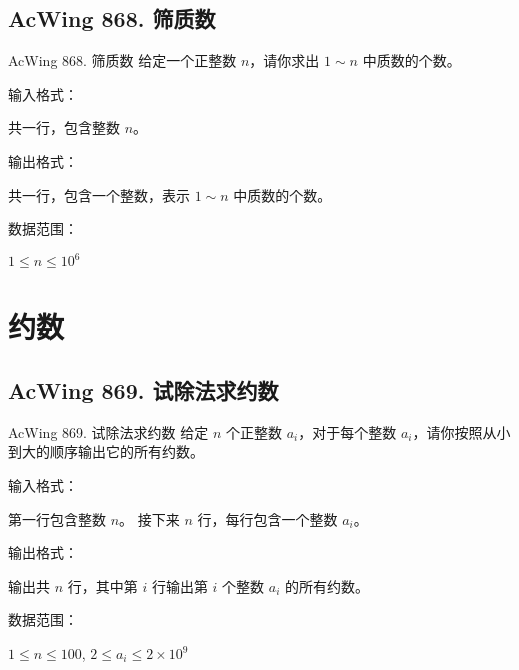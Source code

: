 \subsection{AcWing 868. 筛质数}
\begin{titledbox}{AcWing 868. 筛质数}
    给定一个正整数 $n$，请你求出 $1 \sim n$ 中质数的个数。

    输入格式：

    共一行，包含整数 $n$。

    输出格式：

    共一行，包含一个整数，表示 $1 \sim n$ 中质数的个数。

    数据范围：

    $1 \le n \le 10^6$

    \begin{inputblock}
    \end{inputblock}
    \begin{outputblock}
    \end{outputblock}
\end{titledbox}


\section{约数}

\subsection{AcWing 869. 试除法求约数}
\begin{titledbox}{AcWing 869. 试除法求约数}
    给定 $n$ 个正整数 $a_i$，对于每个整数 $a_i$，请你按照从小到大的顺序输出它的所有约数。

    输入格式：

    第一行包含整数 $n$。 接下来 $n$ 行，每行包含一个整数 $a_i$。

    输出格式：

    输出共 $n$ 行，其中第 $i$ 行输出第 $i$ 个整数 $a_i$ 的所有约数。

    数据范围：

    $1 \le n \le 100$, $2 \le a_i \le 2 \times 10^9$

    \begin{inputblock}
         \\
         \\
    \end{inputblock}
    \begin{outputblock}
         \\
    \end{outputblock}
\end{titledbox}

